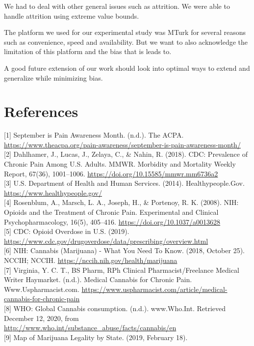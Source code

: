 \documentclass[
]{article}
\begin{document}
We had to deal with other general issues such as attrition. We were able
to handle attrition using extreme value bounds.

The platform we used for our experimental study was MTurk for several
reasons such as convenience, speed and availability. But we want to also
acknowledge the limitation of this platform and the bias that is leads
to.

A good future extension of our work should look into optimal ways to
extend and generalize while minimizing bias.

\hypertarget{references}{%
\section{References}\label{references}}

{[}1{]} September is Pain Awareness Month. (n.d.). The ACPA.
\url{https://www.theacpa.org/pain-awareness/september-is-pain-awareness-month/}\\
{[}2{]} Dahlhamer, J., Lucas, J., Zelaya, C., \& Nahin, R. (2018). CDC:
Prevalence of Chronic Pain Among U.S. Adults. MMWR. Morbidity and
Mortality Weekly Report, 67(36), 1001--1006.
\url{https://doi.org/10.15585/mmwr.mm6736a2}\\
{[}3{]} U.S. Department of Health and Human Services. (2014).
Healthypeople.Gov. \url{https://www.healthypeople.gov/}\\
{[}4{]} Rosenblum, A., Marsch, L. A., Joseph, H., \& Portenoy, R. K.
(2008). NIH: Opioids and the Treatment of Chronic Pain. Experimental and
Clinical Psychopharmacology, 16(5), 405--416.
\url{https://doi.org/10.1037/a0013628}\\
{[}5{]} CDC: Opioid Overdose in U.S. (2019).
\url{https://www.cdc.gov/drugoverdose/data/prescribing/overview.html}\\
{[}6{]} NIH: Cannabis (Marijuana) - What You Need To Know. (2018,
October 25). NCCIH; NCCIH.
\url{https://nccih.nih.gov/health/marijuana}\\
{[}7{]} Virginia, Y. C. T., BS Pharm, RPh Clinical Pharmacist/Freelance
Medical Writer Haymarket. (n.d.). Medical Cannabis for Chronic Pain.
Www.Uspharmacist.com.
\url{https://www.uspharmacist.com/article/medical-cannabis-for-chronic-pain}\\
{[}8{]} WHO: Global Cannabis consumption. (n.d.). www.Who.Int. Retrieved
December 12, 2020, from
\url{http://www.who.int/substance_abuse/facts/cannabis/en}\\
{[}9{]} Map of Marijuana Legality by State. (2019, February 18).
\end{document}
